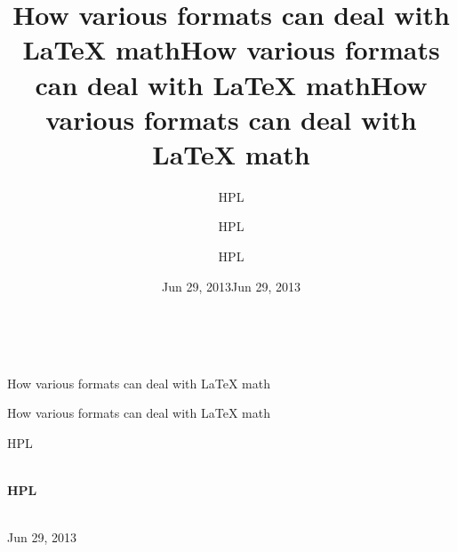 \documentclass[%
oneside,                 %
final,                   %
10pt]{article}
\begin{document}







\title{How various formats can deal with {\LaTeX} math}


\thispagestyle{empty}
\hbox{\ \ }
\vfill
\begin{center}
{\huge{\bfseries{
\begin{spacing}{1.25}
How various formats can deal with {\LaTeX} math
\end{spacing}
}}}

\title*{How various formats can deal with {\LaTeX} math}

\title{How various formats can deal with {\LaTeX} math}
\begin{center}
{\LARGE\bf
\begin{spacing}{1.25}
How various formats can deal with {\LaTeX} math
\end{spacing}
}
\end{center}

\author{HPL}

\vspace{1.3cm}

    {\Large\textsf{HPL${}^{}$}}\\ [3mm]
    
\ \\ [2mm]


\author{HPL}

\author{HPL\inst{}}
\institute{}

\begin{center}
{\bf HPL${}^{}$} \\ [0mm]
\end{center}

\begin{center}
\end{center}


\date{Jun 29, 2013}
\maketitle
\date{Jun 29, 2013
}

\ \\ [10mm]
{\large\textsf{Jun 29, 2013}}

\end{center}
\vfill
\clearpage
\end{document}
